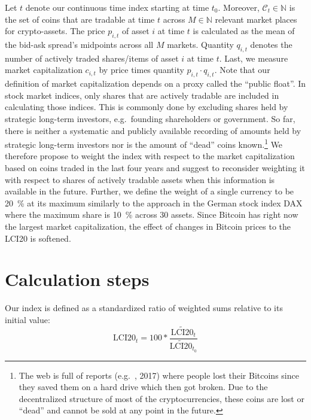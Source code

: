 \documentclass[11pt]{article}
\begin{document}
Let $t$ denote our continuous time index starting at time $t_0$.
Moreover, $\mathcal{C}_t \in \mathbb{N}$ is the set of coins that are tradable at time $t$ across $M \in \mathbb{N}$ relevant market places for crypto-assets.
The price $p_{i,t}$ of asset $i$ at time $t$ is calculated as the mean of the bid-ask spread's midpoints across all $M$ markets.
Quantity $q_{i,t}$ denotes the number of actively traded shares/items of asset $i$ at time $t$.
Last, we measure market capitalization $c_{i,t}$ by price times quantity $p_{i,t} \cdot q_{i,t}$.
Note that our definition of market capitalization depends on a proxy  called the ``public float''.
In stock market indices, only shares that are actively tradable are included in calculating those indices.
This is commonly done by excluding shares held by strategic long-term investors, e.g.\ founding shareholders or government.
So far, there is neither a systematic and publicly available recording of amounts held by strategic long-term investors nor is the amount of ``dead'' coins known.\footnote{The web is full of reports (e.g.\ \citeauthor{LetsTalkBitcoin}, 2017) where people lost their Bitcoins since they saved them on a hard drive which then got broken.
Due to the decentralized structure of most of the cryptocurrencies, these coins are lost or ``dead'' and cannot be sold at any point in the future.}
We therefore propose to weight the index with respect to the market capitalization based on coins traded in the last four years and suggest to reconsider weighting it with respect to shares of actively tradable assets when this information is available in the future.
Further, we define the weight of a single currency to be 20~\% at its maximum similarly to the approach in the German stock index DAX where the maximum share is 10~\% across 30 assets.
Since Bitcoin has right now the largest market capitalization, the effect of changes in Bitcoin prices to the LCI20 is softened.


\section{Calculation steps}

Our index is defined as a standardized ratio of weighted sums relative to its initial value:
\begin{equation}
  \text{LCI20}_t = 100 * \frac{\widetilde{\text{LCI20}}_t}{\widetilde{\text{LCI20}}_{t_0}}
\end{equation}
\end{document}
